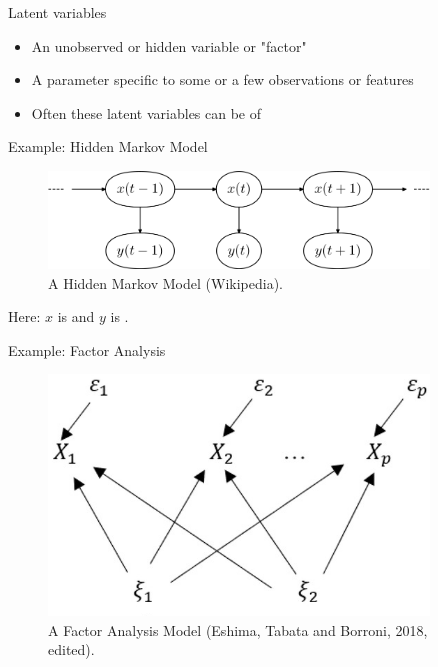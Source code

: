 \documentclass[10pt]{beamer}
\begin{document}
\begin{frame}{Latent variables}
\begin{itemize}
\item An {\color{uured} unobserved} or {\color{uured} hidden} variable or "factor"\pause
\item A parameter specific to some or a few observations or features\pause
\item Often these latent variables can be of 
\end{itemize}

\end{frame}

\begin{frame}{Example: Hidden Markov Model}

\begin{figure}[h]
\centering
\includegraphics[width=0.9\textwidth]{fig/hmm.png}
\caption{A Hidden Markov Model (Wikipedia). }
\end{figure}

Here: $x$ is  and $y$ is .

\end{frame}


\begin{frame}{Example: Factor Analysis}

\begin{figure}[h]
\centering
\includegraphics[width=0.9\textwidth]{fig/FM.png}
\caption{A Factor Analysis Model (Eshima, Tabata and Borroni, 2018, edited).}
\end{figure}

\end{frame}
\end{document}
